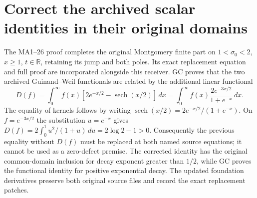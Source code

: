 \documentclass[11pt]{article}
\newcommand{\dd}{\,d}\newcommand{\im}{\operatorname{im}}
\begin{document}
\section{Correct the archived scalar identities in their original domains}
The MA1--26 proof completes the original Montgomery finite part on
$1<\sigma_0<2$, $x\ge1$, $t\in\mathbb R$, retaining its jump and both poles.
Its exact replacement equation and full proof are incorporated alongside
this receiver. GC proves that the two archived Guinand--Weil functionals
are related by the additional linear functional
\begin{equation}\tag{A3R13}
 D(f)=\int_0^\infty f(x)
 [2e^{-x/2}-\operatorname{sech}(x/2)]\dd x
 =\int_0^\infty f(x)\frac{2e^{-3x/2}}{1+e^{-x}}\dd x.
\end{equation}
The equality of kernels follows by writing
$\operatorname{sech}(x/2)=2e^{-x/2}/(1+e^{-x})$.
On $f=e^{-3x/2}$ the substitution $u=e^{-x}$ gives
$D(f)=2\int_0^1u^2/(1+u)\dd u=2\log2-1>0$.
Consequently the previous equality without $D(f)$ must be replaced at
both named source equations; it cannot be used as a zero-defect premise.
The corrected identity has the original common-domain inclusion for decay
exponent greater than $1/2$, while GC proves the functional identity for
positive exponential decay. The updated foundation derivatives preserve
both original source files and record the exact replacement patches.
\end{document}

